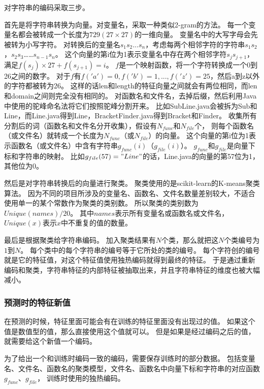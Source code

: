 对字符串的编码采取三步。

首先是将字符串转换为向量。对变量名，采取一种类似2-gram的方法。
每一个变量名都会被转成一个长度为$729 (27 \times 27)$的一维向量。
变量名中的大写字母会先被转为小写字符。
对转换后的变量名$s_1s_2...s_n$，考虑每两个相邻字符的字符串$s_1s_2$，$s_2s_3$……$s_{n - 1}s_n$。
这个向量的第i位为1表示变量名中存在两个相邻字符$s_js_{j+1}$，满足$f(s_j) \times 27 + f(s_{j + 1}) = i$。
$f$是一个映射函数，将一个字符转换成一个0到26之间的数字。
对于$f$有$f('a') = 0, f('b') = 1, ..., f('z') = 25$，然后a到z以外的字符都被转为26。
这样的话len和length的特征向量之间就会有两位相同，而len和domain之间则完全没有相同的。
对函数名和文件名，去掉后缀，然后利用Java中使用的驼峰命名法将它们按照驼峰分割开来。
比如SubLine.java会被拆为Sub和Line，而Line.java得到Line，BracketFinder.java得到Bracket和Finder。
收集所有分割后的词（函数名和文件名分开收集），假设有$N_{func}$和$N_{file}$个，
则每个函数名（或文件名）就转成一个长度为$N_{func}$（或$N_{file}$）的向量。
这个向量的第i位为1表示函数名（或文件名）中含有字符串$g_{func}(i)$（$g_{file}(i)$）。
$g_{func}$和$g_{file}$是向量下标和字符串的映射。
比如$g_{file}(57) = "Line"$的话，Line.java的向量的第57位为1，其他位为0。

然后是对字符串转换后的向量进行聚类。
聚类使用的是scikit-learn的K-means聚类算法。
因为不同的项目所涉及的变量名、函数名、文件名数量差别较大，不适合使用单一的某个常数作为聚类的类别数。
所以聚类的类别数为$Unique(names) / 20$。
其中$names$表示所有变量名或函数名或文件名，$Unique(x)$表示$x$中不重复的值的数量。

最后是根据聚类给字符串编码。
加入聚类结果有$N$个类，那么就把这$N$个类编号为$1$到$N$。
每个类中的每个字符串的编号等于它所处的类的编号。
每个字符创的编号就是它的特征值，对这个特征值使用独热编码就得到最终的特征。
于是通过重新编码和聚类，字符串特征的内部特征被抽取出来，并且字符串特征的维度也被大幅减小。

\subsubsection{预测时的特征新值}

在预测的时候，特征里面可能会有在训练的特征里面没有出现过的值。
如果这个值是数值型的值，那么直接使用这个值就可以。
但是如果是经过编码之后的值，就需要给这个新值一个编码。

为了给出一个和训练时编码一致的编码，需要保存训练时的部分数据。
包括变量名、文件名、函数名的聚类模型，文件名、函数名中向量下标和字符串的对应函数$g_{func}$、$g_{file}$，
训练时使用的独热编码。

